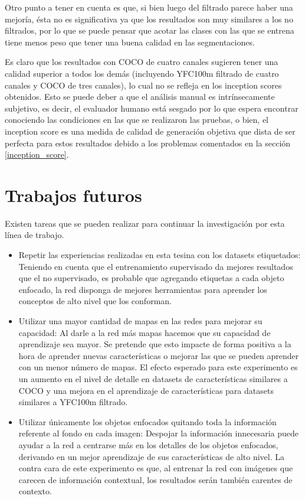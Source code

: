 \documentclass[spanish]{report}
\begin{document}
Otro punto a tener en cuenta es que, si bien luego del filtrado parece haber una mejoría, ésta no es significativa ya que los resultados son muy similares a los no filtrados, por lo que se puede pensar que acotar las clases con las que se entrena tiene menos peso que tener una buena calidad en las segmentaciones.

Es claro que los resultados con COCO de cuatro canales sugieren tener una calidad superior a todos los demás (incluyendo YFC100m filtrado de cuatro canales y COCO de tres canales), lo cual no se refleja en los inception scores obtenidos. Esto se puede deber a que el análisis manual es intrínsecamente subjetivo, es decir, el evaluador humano está sesgado por lo que espera encontrar conociendo las condiciones en las que se realizaron las pruebas, o bien, el inception score es una medida de calidad de generación objetiva que dista de ser perfecta para estos resultados debido a los problemas comentados en la sección \ref{inception_score}.

\section{Trabajos futuros}

Existen tareas que se pueden realizar para continuar la investigación por esta línea de trabajo.

\begin{itemize}
\item Repetir las experiencias realizadas en esta tesina con los datasets etiquetados: Teniendo en cuenta que el entrenamiento supervisado da mejores resultados que el no supervisado, es probable que agregando etiquetas a cada objeto enfocado, la red disponga de mejores herramientas para aprender los conceptos de alto nivel que los conforman.


\item Utilizar una mayor cantidad de mapas en las redes para mejorar su capacidad: Al darle a la red más mapas hacemos que su capacidad de aprendizaje sea mayor. Se pretende que esto impacte de forma positiva a la hora de aprender nuevas características o mejorar las que se pueden aprender con un menor número de mapas. El efecto esperado para este experimento es un aumento en el nivel de detalle en datasets de características similares a COCO y una mejora en el aprendizaje de características para datasets similares a YFC100m filtrado.

\item Utilizar únicamente los objetos enfocados quitando toda la información referente al fondo en cada imagen: Despojar la información innecesaria puede ayudar a la red a centrarse más en los detalles de los objetos enfocados, derivando en un mejor aprendizaje de sus características de alto nivel. La contra cara de este experimento es que, al entrenar la red con imágenes que carecen de información contextual, los resultados serán también carentes de contexto. %
\end{itemize}
\end{document}
